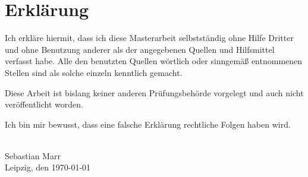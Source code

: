 \chapter*{Erklärung}

Ich erkläre hiermit, dass ich diese Masterarbeit selbstständig ohne Hilfe Dritter und ohne Benutzung anderer als der angegebenen Quellen und Hilfsmittel verfasst habe. Alle den benutzten Quellen wörtlich oder sinngemäß entnommenen Stellen sind als solche einzeln kenntlich gemacht.

Diese Arbeit ist bislang keiner anderen Prüfungsbehörde vorgelegt und auch nicht veröffentlicht worden.

Ich bin mir bewusst, dass eine falsche Erklärung rechtliche Folgen haben wird. 

{
\vspace{32pt}
\noindent
\hdashrule{5cm}{1pt}{1pt 3pt}\\
Sebastian Marr\\
Leipzig, den \today
}
